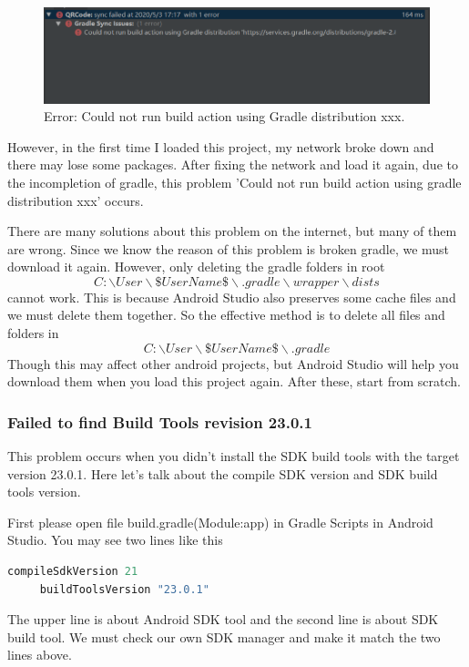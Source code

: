 \documentclass{article}
\begin{document}
\begin{figure}[htbp]
     \centering
     \includegraphics[width=\linewidth]{error1.jpg}
     \caption{Error: Could not run build action using Gradle distribution xxx.}
\end{figure}

However, in the first time I loaded this project, my network broke down and there may lose some packages. After fixing the network and load it again, due to the incompletion of gradle, this problem 'Could not run build action using gradle distribution xxx' occurs.

There are many solutions about this problem on the internet, but many of them are wrong. Since we know the reason of this problem is broken gradle, we must download it again. However, only deleting the gradle folders in root
$$C:\backslash User\backslash \$UserName\$\backslash .gradle\backslash wrapper\backslash dists$$
cannot work. This is because Android Studio also preserves some cache files and we must delete them together. So the effective method is to delete all files and folders in
$$C:\backslash User\backslash \$UserName\$\backslash .gradle$$
Though this may affect other android projects, but Android Studio will help you download them when you load this project again. After these, start from scratch.

\subsubsection{Failed to find Build Tools revision 23.0.1}
This problem occurs when you didn't install the SDK build tools with the target version 23.0.1. Here let's talk about the compile SDK version and SDK build tools version.

First please open file build.gradle(Module:app) in Gradle Scripts in Android Studio. You may see two lines like this
\begin{lstlisting}[language=Java]
     compileSdkVersion 21
     buildToolsVersion "23.0.1"
\end{lstlisting}
The upper line is about Android SDK tool and the second line is about SDK build tool. We must check our own SDK manager and make it match the two lines above.
\end{document}
